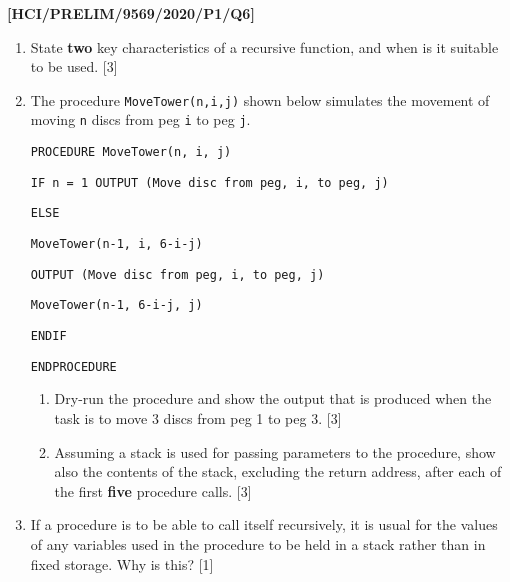 \item \textbf{{[}HCI/PRELIM/9569/2020/P1/Q6{]} }
\begin{enumerate}
\item State \textbf{two} key characteristics of a recursive function, and
when is it suitable to be used. {[}3{]}
\item The procedure \texttt{MoveTower(n,i,j)} shown below simulates the
movement of moving \texttt{n} discs from peg \texttt{i} to peg \texttt{j}.

\noindent %
\noindent\begin{minipage}[t]{1\columnwidth}%
\texttt{PROCEDURE MoveTower(n, i, j) }

\texttt{\qquad{}IF n = 1 OUTPUT (\textquotedbl Move disc from peg\textquotedbl ,
i, \textquotedbl to peg\textquotedbl , j) }

\texttt{\qquad{}ELSE }

\texttt{\qquad{}\qquad{}MoveTower(n-1, i, 6-i-j) }

\texttt{\qquad{}\qquad{}OUTPUT (\textquotedbl Move disc from peg\textquotedbl ,
i, \textquotedbl to peg\textquotedbl , j) }

\texttt{\qquad{}\qquad{}MoveTower(n-1, 6-i-j, j) }

\texttt{\qquad{}ENDIF}

\texttt{ENDPROCEDURE}%
\end{minipage}
\begin{enumerate}
\item Dry-run the procedure and show the output that is produced when the
task is to move 3 discs from peg 1 to peg 3. \hfill{}{[}3{]}
\item Assuming a stack is used for passing parameters to the procedure,
show also the contents of the stack, excluding the return address,
after each of the first \textbf{five} procedure calls. \hfill{} {[}3{]}
\end{enumerate}
\item If a procedure is to be able to call itself recursively, it is usual
for the values of any variables used in the procedure to be held in
a stack rather than in fixed storage. Why is this? \hfill{}{[}1{]}
\end{enumerate}